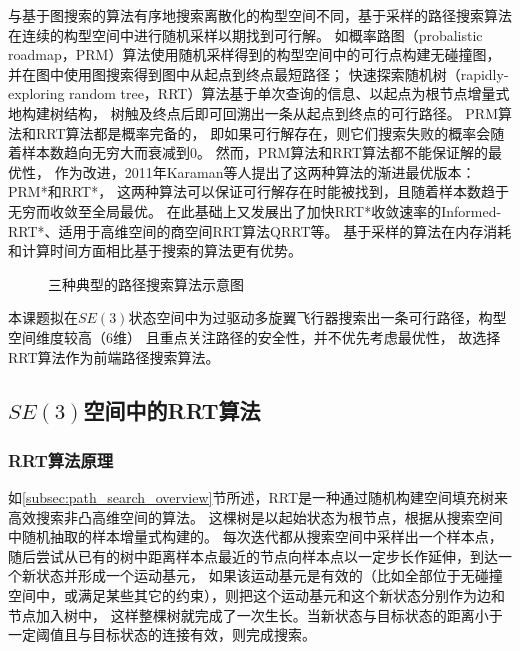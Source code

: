 与基于图搜索的算法有序地搜索离散化的构型空间不同，基于采样的路径搜索算法在连续的构型空间中进行随机采样以期找到可行解。
如概率路图（probalistic roadmap，PRM）算法\cite{kavraki1996probabilistic}使用随机采样得到的构型空间中的可行点构建无碰撞图，
并在图中使用图搜索得到图中从起点到终点最短路径；
快速探索随机树（rapidly-exploring random tree，RRT）\cite{lavalle1998rapidly}算法基于单次查询的信息、以起点为根节点增量式地构建树结构，
树触及终点后即可回溯出一条从起点到终点的可行路径。
PRM算法和RRT算法都是概率完备的\cite{kavraki1998analysis,frazzoli2002real}，
即如果可行解存在，则它们搜索失败的概率会随着样本数趋向无穷大而衰减到0。
然而，PRM算法和RRT算法都不能保证解的最优性，
作为改进，2011年Karaman等人提出了这两种算法的渐进最优版本：PRM*和RRT*\cite{karaman2011sampling}，
这两种算法可以保证可行解存在时能被找到，且随着样本数趋于无穷而收敛至全局最优。
在此基础上又发展出了加快RRT*收敛速率的Informed-RRT*\cite{gammell2014informed}、适用于高维空间的商空间RRT算法QRRT\cite{orthey2019rapidly}等。
基于采样的算法在内存消耗和计算时间方面相比基于搜索的算法更有优势。
\begin{figure}[!ht]
  \setlength{\subfigcapskip}{-1bp}
  \centering
  \begin{minipage}{\textwidth}
  \centering
  \subfigure{\label{fig:schem_diag_jps}}\addtocounter{subfigure}{-2}
  \hspace{0.2em}
  \subfigure{\label{fig:schem_diag_prm}}\addtocounter{subfigure}{-2}
  \hspace{0.2em}
  \subfigure{\label{fig:schem_diag_rrt}}\addtocounter{subfigure}{-2}
  \end{minipage}
  \caption{三种典型的路径搜索算法示意图\label{fig:three_methods_of_path_search}}
\end{figure}

本课题拟在$SE(3)$状态空间中为过驱动多旋翼飞行器搜索出一条可行路径，构型空间维度较高（6维）
且重点关注路径的安全性，并不优先考虑最优性，
故选择RRT算法作为前端路径搜索算法。
\subsection{$SE(3)$空间中的RRT算法}\label{subsec:rrt_in_SE3}
\subsubsection{RRT算法原理}\label{subsubsec:process_of_rrt}
如\ref{subsec:path_search_overview}节所述，RRT是一种通过随机构建空间填充树来高效搜索非凸高维空间的算法。
这棵树是以起始状态为根节点，根据从搜索空间中随机抽取的样本增量式构建的。
每次迭代都从搜索空间中采样出一个样本点，随后尝试从已有的树中距离样本点最近的节点向样本点以一定步长作延伸，到达一个新状态并形成一个运动基元，
如果该运动基元是有效的（比如全部位于无碰撞空间中，或满足某些其它的约束），则把这个运动基元和这个新状态分别作为边和节点加入树中，
这样整棵树就完成了一次生长。当新状态与目标状态的距离小于一定阈值且与目标状态的连接有效，则完成搜索。


